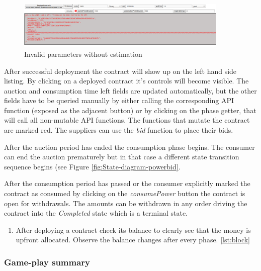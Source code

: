 \documentclass[a4paper]{article}
\begin{document}
\begin{figure}[H]
    \centering
    \includegraphics[width=0.9\textwidth]{figures/error-noestimation.png}
    \caption{Invalid parameters without estimation}
    \label{fig:deploy-error-est}
\end{figure}


After successful deployment the contract will show up on the left hand side listing. By clicking on a deployed contract it's controls will become visible. The auction and consumption time left fields are updated automatically, but the other fields have to be queried manually by either calling the corresponding API function (exposed as the adjacent button) or by clicking on the phase getter, that will call all non-mutable API functions. The functions that mutate the contract are marked red. The suppliers can use the \emph{bid} function to place their bids.

After the auction period has ended the consumption phase begins. The consumer can end the auction prematurely but in that case a different state transition sequence begins (see Figure \ref{fig:State-diagram-powerbid}.

After the consumption period has passed or the consumer explicitly marked the contract as consumed by clicking on the \emph{consumePower} button the contract is open for withdrawals. The amounts can be withdrawn in any order driving the contract into the \emph{Completed} state which is a terminal state.


\begin{enumerate}[label=\textbf{Task \arabic*}:,l_tasks]
\item After deploying a contract check its balance to clearly see that the money is upfront allocated. Observe the balance changes after every phase. \ref{lst:block}
\end{enumerate}

\subsubsection{Game-play summary}
\end{document}
